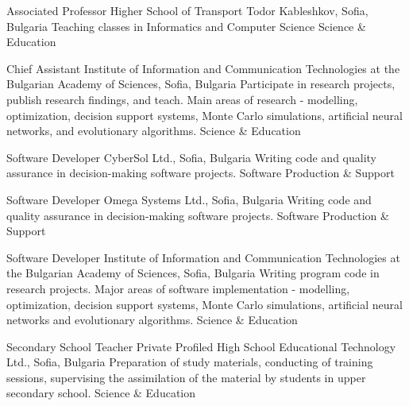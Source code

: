 \documentclass[english,a4paper]{europasscv}
\begin{document}
  \begin{europasscv}

  \ecvpersonalinfo


  
   {Associated Professor}
  \ecvitem {} {Higher School of Transport Todor Kableshkov, Sofia, Bulgaria}
  \ecvitem {} {Teaching classes in Informatics and Computer Science}
  \ecvitem {} { \quad Science \& Education}
  
   {Chief Assistant}
  \ecvitem {} {Institute of Information and Communication Technologies at the Bulgarian Academy of Sciences, Sofia, Bulgaria}
  \ecvitem {} {Participate in research projects, publish research findings, and teach. Main areas of research - modelling, optimization, decision support systems, Monte Carlo simulations, artificial neural networks, and evolutionary algorithms.}
  \ecvitem {} { \quad Science \& Education}
  
   {Software Developer}
  \ecvitem {} {CyberSol Ltd., Sofia, Bulgaria}
  \ecvitem {} {Writing code and quality assurance in decision-making software projects.}
  \ecvitem {} { \quad Software Production \& Support}
  
   {Software Developer}
  \ecvitem {} {Omega Systems Ltd., Sofia, Bulgaria}
  \ecvitem {} {Writing code and quality assurance in decision-making software projects.}
  \ecvitem {} { \quad Software Production \& Support}
  
   {Software Developer}
  \ecvitem {} {Institute of Information and Communication Technologies at the Bulgarian Academy of Sciences, Sofia, Bulgaria}
  \ecvitem {} {Writing program code in research projects. Major areas of software implementation - modelling, optimization, decision support systems, Monte Carlo simulations, artificial neural networks and evolutionary algorithms.}
  \ecvitem {} { \quad Science \& Education}
  
   {Secondary School Teacher}
  \ecvitem {} {Private Profiled High School Educational Technology Ltd., Sofia, Bulgaria}
  \ecvitem {} {Preparation of study materials, conducting of training sessions, supervising the assimilation of the material by students in upper secondary school.}
  \ecvitem {} { \quad Science \& Education}
  

\end{europasscv}
\end{document}
